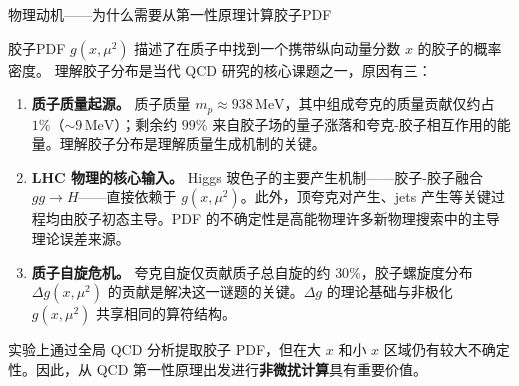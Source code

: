 \documentclass[10pt,aspectratio=169]{beamer}
\newcommand{\MeV}{\,\mathrm{MeV}}
\begin{document}
\begin{frame}{物理动机——为什么需要从第一性原理计算胶子PDF}

  胶子PDF $g(x,\mu^2)$ 描述了在质子中找到一个携带纵向动量分数 $x$ 的胶子的概率密度。
  理解胶子分布是当代 QCD 研究的核心课题之一，原因有三：

  \vspace{4pt}
  \begin{enumerate}
    \item \textbf{质子质量起源。} 质子质量 $m_p \approx 938\MeV$，其中组成夸克的质量贡献仅约占 $1\%$（$\sim 9\MeV$）；剩余约 $99\%$ 来自胶子场的量子涨落和夸克-胶子相互作用的能量。理解胶子分布是理解质量生成机制的关键。

    \item \textbf{LHC 物理的核心输入。} Higgs 玻色子的主要产生机制——胶子-胶子融合 $gg \to H$——直接依赖于 $g(x,\mu^2)$。此外，顶夸克对产生、jets 产生等关键过程均由胶子初态主导。PDF 的不确定性是高能物理许多新物理搜索中的主导理论误差来源。

    \item \textbf{质子自旋危机。} 夸克自旋仅贡献质子总自旋的约 $30\%$，胶子螺旋度分布 $\Delta g(x,\mu^2)$ 的贡献是解决这一谜题的关键。$\Delta g$ 的理论基础与非极化 $g(x,\mu^2)$ 共享相同的算符结构。
  \end{enumerate}

  实验上通过全局 QCD 分析提取胶子 PDF，但在大 $x$ 和小 $x$ 区域仍有较大不确定性。因此，从 QCD 第一性原理出发进行\textbf{非微扰计算}具有重要价值。
\end{frame}
\end{document}
